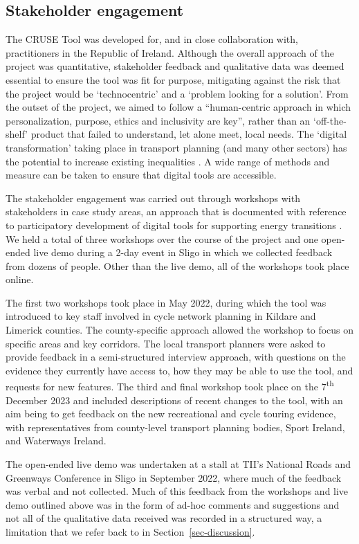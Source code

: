 \documentclass[
  super,
  preprint,
  3p]{elsarticle}
\begin{document}
\subsection{Stakeholder engagement}\label{sec-stakeholder-engagement}

The CRUSE Tool was developed for, and in close collaboration with,
practitioners in the Republic of Ireland. Although the overall approach
of the project was quantitative, stakeholder feedback and qualitative
data was deemed essential to ensure the tool was fit for purpose,
mitigating against the risk that the project would be `technocentric'
and a `problem looking for a solution'. From the outset of the project,
we aimed to follow a ``human-centric approach in which personalization,
purpose, ethics and inclusivity are key'', rather than an
`off-the-shelf' product that failed to understand, let alone meet, local
needs. The `digital transformation' taking place in transport planning
(and many other sectors) has the potential to increase existing
inequalities \citep{coppola2022}. A wide range of methods and measure
can be taken to ensure that digital tools are accessible.

The stakeholder engagement was carried out through workshops with
stakeholders in case study areas, an approach that is documented with
reference to participatory development of digital tools for supporting
energy transitions \citep{hewitt2020}. We held a total of three
workshops over the course of the project and one open-ended live demo
during a 2-day event in Sligo in which we collected feedback from dozens
of people. Other than the live demo, all of the workshops took place
online.

The first two workshops took place in May 2022, during which the tool
was introduced to key staff involved in cycle network planning in
Kildare and Limerick counties. The county-specific approach allowed the
workshop to focus on specific areas and key corridors. The local
transport planners were asked to provide feedback in a semi-structured
interview approach, with questions on the evidence they currently have
access to, how they may be able to use the tool, and requests for new
features. The third and final workshop took place on the
7\textsuperscript{th} December 2023 and included descriptions of recent
changes to the tool, with an aim being to get feedback on the new
recreational and cycle touring evidence, with representatives from
county-level transport planning bodies, Sport Ireland, and Waterways
Ireland.

{The open-ended live demo was undertaken at a stall at TII's National
Roads and Greenways Conference in Sligo in September 2022, where much of
the feedback was verbal and not collected. Much of this feedback from
the workshops and live demo outlined above was in the form of ad-hoc
comments and suggestions and not all of the qualitative data received
was recorded in a structured way, a limitation that we refer back to in
Section~\ref{sec-discussion}.}
\end{document}
